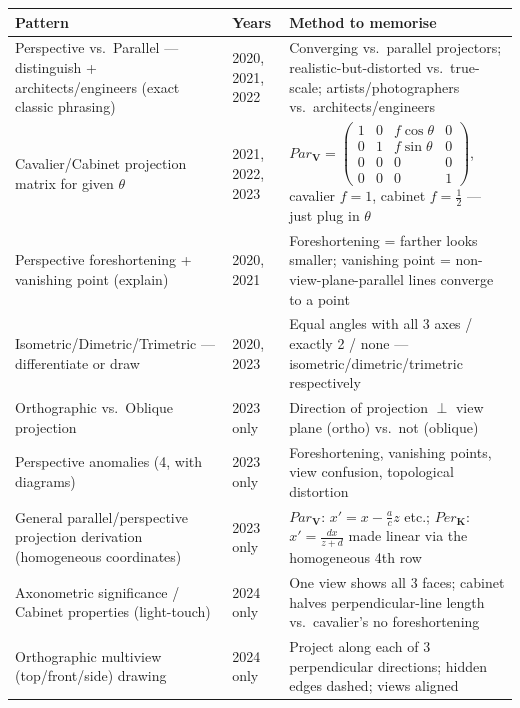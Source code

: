 \documentclass[12pt, a4paper]{article}
\begin{document}
\begin{center}
\renewcommand{\arraystretch}{1.3}
\begin{tabular}{p{4.6cm}|p{2.5cm}|p{6.9cm}}
\toprule
\textbf{Pattern} & \textbf{Years} & \textbf{Method to memorise} \\
\midrule
Perspective vs.\ Parallel --- distinguish + architects/engineers (exact classic phrasing) & 2020, 2021, 2022 & Converging vs.\ parallel projectors; realistic-but-distorted vs.\ true-scale; artists/photographers vs.\ architects/engineers \\
Cavalier/Cabinet projection matrix for given $\theta$ & 2021, 2022, 2023 & $Par_{\mathbf V}=\begin{pmatrix}1&0&f\cos\theta&0\\0&1&f\sin\theta&0\\0&0&0&0\\0&0&0&1\end{pmatrix}$, cavalier $f=1$, cabinet $f=\tfrac12$ --- just plug in $\theta$ \\
Perspective foreshortening + vanishing point (explain) & 2020, 2021 & Foreshortening = farther looks smaller; vanishing point = non-view-plane-parallel lines converge to a point \\
Isometric/Dimetric/Trimetric --- differentiate or draw & 2020, 2023 & Equal angles with all 3 axes / exactly 2 / none --- isometric/dimetric/trimetric respectively \\
Orthographic vs.\ Oblique projection & 2023 only & Direction of projection $\perp$ view plane (ortho) vs.\ not (oblique) \\
Perspective anomalies (4, with diagrams) & 2023 only & Foreshortening, vanishing points, view confusion, topological distortion \\
General parallel/perspective projection derivation (homogeneous coordinates) & 2023 only & $Par_{\mathbf V}$: $x'=x-\frac{a}{c}z$ etc.; $Per_{\mathbf K}$: $x'=\frac{dx}{z+d}$ made linear via the homogeneous 4th row \\
Axonometric significance / Cabinet properties (light-touch) & 2024 only & One view shows all 3 faces; cabinet halves perpendicular-line length vs.\ cavalier's no foreshortening \\
Orthographic multiview (top/front/side) drawing & 2024 only & Project along each of 3 perpendicular directions; hidden edges dashed; views aligned \\
\bottomrule
\end{tabular}
\end{center}
\end{document}
